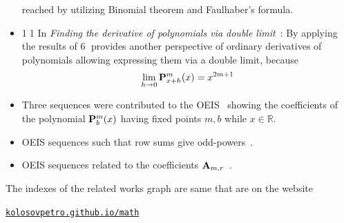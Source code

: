 \begin{itemize}
    reached by utilizing Binomial theorem and Faulhaber's formula.
    \item {\Large \textcircled{\normalsize 11}}
    In \textit{Finding the derivative of polynomials via double limit}~\cite{kolosov_2024_10575485}:
    By applying the results of {\Large \textcircled{\normalsize 6}} provides
    another perspective of ordinary derivatives of polynomials allowing expressing
    them via a double limit, because
    \begin{align*}
        \lim_{h \to 0} {\mathbf{P}}\sp{m} \sb{x+h}(x) = x^{2m+1}
    \end{align*}
    \item Three sequences were contributed to the
    OEIS~\cite{kolosov2018coefficientspolynomial1, kolosov2018coefficientspolynomial2, kolosov2018coefficientspolynomial3}
    showing the coefficients of the polynomial ${\mathbf{P}}\sp{m} \sb{b}(x)$ having fixed points $m,b$ while $x\in\mathbb{R}$.
    \item OEIS sequences such that row sums give odd-powers~\cite{kolosov2017third, kolosov2018fifth, kolosov2018seventh}.
    \item OEIS sequences related to the coefficients ${\mathbf{A}} \sb{m,r}$~\cite{kolosov2018numerator, kolosov2018denominator}.
\end{itemize}
The indexes of the related works graph are same that are on the website
\begin{center}
    \href{https://kolosovpetro.github.io/math/}{\texttt{kolosovpetro.github.io/math}}
\end{center}
